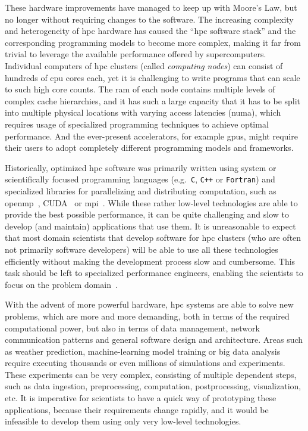 These hardware improvements have managed to keep up with Moore's Law, but no longer without
requiring changes to the software. The increasing complexity and heterogeneity of
\gls{hpc} hardware has caused the ``\gls{hpc} software stack'' and the
corresponding programming models to become more complex, making it far from trivial to leverage the
available performance offered by supercomputers. Individual computers of \gls{hpc}
clusters (called \emph{computing nodes}) can consist of hundreds of \gls{cpu} cores
each, yet it is challenging to write programs that can scale to such high core counts. The
\gls{ram} of each node contains multiple levels of complex cache hierarchies, and it
has such a large capacity that it has to be split into multiple physical locations with varying
access latencies (\gls{numa}), which requires usage of specialized programming
techniques to achieve optimal performance. And the ever-present accelerators, for example
\glspl{gpu}, might require their users to adopt completely different programming models
and frameworks.

Historically, optimized \gls{hpc} software was primarily written using system or
scientifically focused programming languages (e.g.~\texttt{C}, \texttt{C++}
or \texttt{Fortran}) and specialized libraries for parallelizing and distributing
computation, such as \gls{openmp}~\cite{openmp}, CUDA~\cite{cuda} or
\gls{mpi}~\cite{mpistudy}. While these rather low-level technologies are able
to provide the best possible performance, it can be quite challenging and slow to develop (and
maintain) applications that use them. It is unreasonable to expect that most domain scientists that
develop software for \gls{hpc} clusters (who are often not primarily software
developers) will be able to use all these technologies efficiently without making the development
process slow and cumbersome. This task should be left to specialized performance engineers,
enabling the scientists to focus on the problem domain~\cite{dace}.

With the advent of more powerful hardware, \gls{hpc} systems are able to solve new
problems, which are more and more demanding, both in terms of the required computational power, but
also in terms of data management, network communication patterns and general software design and
architecture. Areas such as weather prediction, machine-learning model training or big data
analysis require executing thousands or even millions of simulations and experiments. These
experiments can be very complex, consisting of multiple dependent steps, such as data ingestion,
preprocessing, computation, postprocessing, visualization, etc. It is imperative for scientists to
have a quick way of prototyping these applications, because their requirements change rapidly, and
it would be infeasible to develop them using only very low-level technologies.

